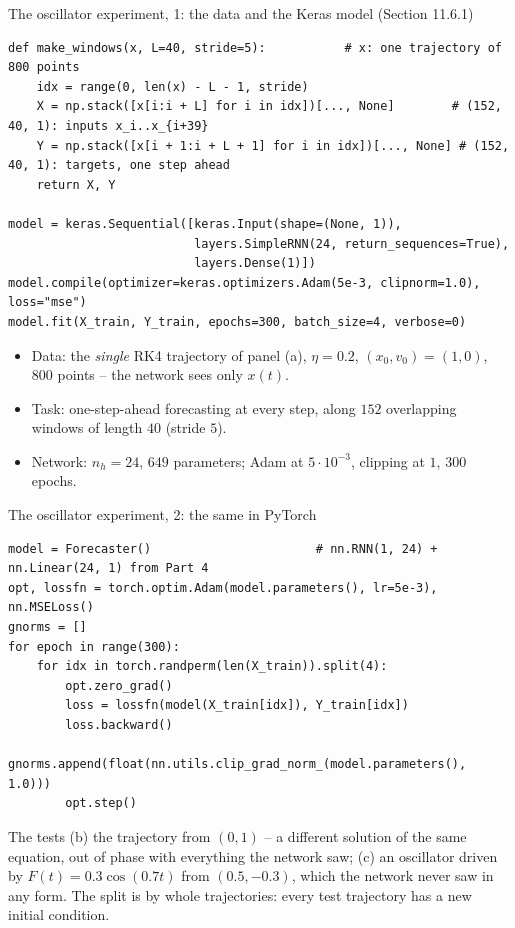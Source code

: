 \documentclass[10pt,aspectratio=169]{beamer}
\begin{document}
\begin{frame}[fragile]{The oscillator experiment, 1: the data and the Keras model (Section 11.6.1)}
\begin{lstlisting}
def make_windows(x, L=40, stride=5):           # x: one trajectory of 800 points
    idx = range(0, len(x) - L - 1, stride)
    X = np.stack([x[i:i + L] for i in idx])[..., None]        # (152, 40, 1): inputs x_i..x_{i+39}
    Y = np.stack([x[i + 1:i + L + 1] for i in idx])[..., None] # (152, 40, 1): targets, one step ahead
    return X, Y

model = keras.Sequential([keras.Input(shape=(None, 1)),
                          layers.SimpleRNN(24, return_sequences=True),
                          layers.Dense(1)])
model.compile(optimizer=keras.optimizers.Adam(5e-3, clipnorm=1.0), loss="mse")
model.fit(X_train, Y_train, epochs=300, batch_size=4, verbose=0)
\end{lstlisting}
\small
\begin{itemize}
  \item Data: the \emph{single} RK4 trajectory of panel (a), $\eta=0.2$,
        $(x_0,v_0)=(1,0)$, $800$ points -- the network sees only $x(t)$.
  \item Task: one-step-ahead forecasting at every step, along $152$
        overlapping windows of length $40$ (stride $5$).
  \item Network: $n_h=24$, $649$ parameters; Adam at $5\cdot10^{-3}$,
        clipping at $1$, $300$ epochs.
\end{itemize}
\end{frame}

\begin{frame}[fragile]{The oscillator experiment, 2: the same in PyTorch}
\begin{lstlisting}
model = Forecaster()                       # nn.RNN(1, 24) + nn.Linear(24, 1) from Part 4
opt, lossfn = torch.optim.Adam(model.parameters(), lr=5e-3), nn.MSELoss()
gnorms = []
for epoch in range(300):
    for idx in torch.randperm(len(X_train)).split(4):
        opt.zero_grad()
        loss = lossfn(model(X_train[idx]), Y_train[idx])
        loss.backward()
        gnorms.append(float(nn.utils.clip_grad_norm_(model.parameters(), 1.0)))
        opt.step()
\end{lstlisting}
\small
\begin{block}{The tests}
(b) the trajectory from $(0,1)$ -- a different solution of the same
equation, out of phase with everything the network saw; (c) an oscillator
driven by $F(t)=0.3\cos(0.7t)$ from $(0.5,-0.3)$, which the network never saw
in any form.  The split is by whole trajectories: every test trajectory has
a new initial condition.
\end{block}
\end{frame}
\end{document}
